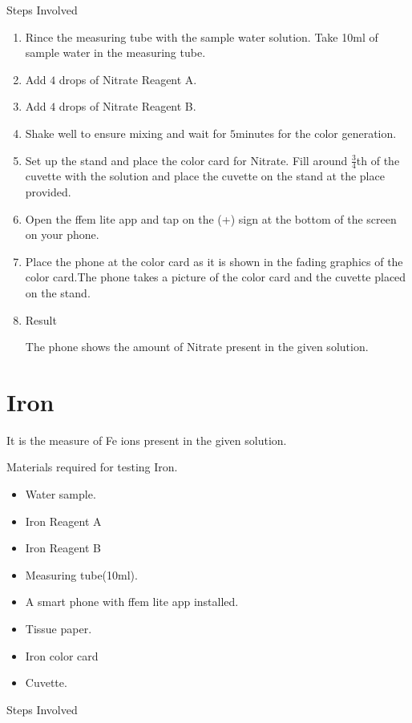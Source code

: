 \documentclass{article}
\begin{document}
 
 \begin{large}
 Steps Involved 
 \end{large}
 
 \begin{enumerate}
 \item Rince the measuring tube with the sample water solution. Take 10ml of sample water in the measuring tube.
 \item Add $4$ drops of Nitrate Reagent A.
 \item Add $4$ drops of Nitrate Reagent B.
 \item Shake well to ensure mixing and wait for $5$minutes for the color generation.
 \item Set up the stand and place the color card for Nitrate. Fill around $\frac{3}{4}$th of the cuvette with  the solution and place the cuvette on the stand at the place provided.
  \item Open the ffem lite app and tap on the (+) sign at the bottom of the screen on your phone.
 \item Place the phone at the color card as it is shown in the fading graphics of the color card.The phone takes a picture of the color card and the cuvette placed on the stand.
 \item Result 
 
 The phone shows the amount of Nitrate present in the given solution.
 \end{enumerate}

\section{Iron}

It is the measure of Fe ions present in the given solution.
    
Materials required for testing Iron.
  \begin{itemize}
  \item Water sample.
  \item Iron Reagent A
  \item Iron Reagent B
  \item Measuring tube(10ml).
  \item A smart phone with ffem lite app installed.
  \item Tissue paper.
  \item  Iron color card
  \item  Cuvette.
  \end{itemize}

 
 \begin{large}
 Steps Involved 
 \end{large}
 
\end{document}
